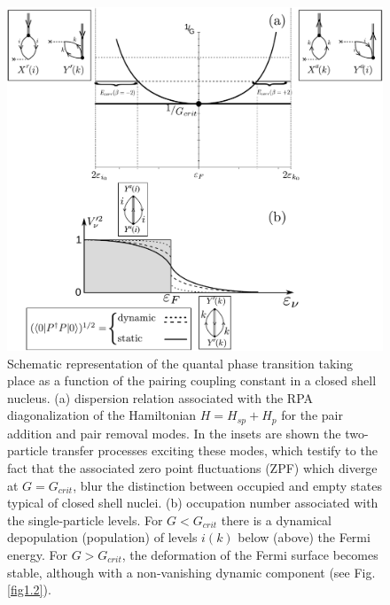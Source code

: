  \begin{figure}
  \centerline{\includegraphics*[width=\textwidth,angle=0]{nutshell/figs/fig1E6.pdf}}
  \caption[Quantal phase transition taking place as a function of the pairing coupling
  constant in a  closed shell nucleus.]{Schematic representation of the quantal phase transition taking place as a function of the pairing coupling
  constant in a  closed shell nucleus. (a)
  dispersion relation associated with the RPA diagonalization of the Hamiltonian
  $H = H_{sp} + H_p$ for the pair addition and pair removal modes. In the insets are
  shown the two-particle transfer processes exciting these modes, which testify to
  the fact that the associated zero point fluctuations (ZPF) which diverge at
  $G = G_{crit}$, blur the distinction between occupied and empty states typical of
  closed shell nuclei. (b) occupation number associated with the single-particle
  levels. For $G < G_{crit}$ there is a dynamical depopulation (population) of levels
  $ i(k)$ below (above) the Fermi energy. For $G > G_{crit}$,
  the deformation of the Fermi
  surface becomes stable, although with a non-vanishing dynamic component (see Fig. \ref{fig1.2}).}\label{fig1E6}
  \end{figure}
